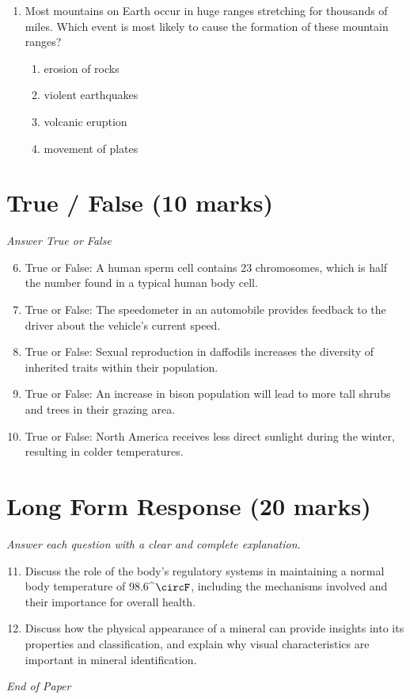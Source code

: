 \documentclass[12pt]{article}
\begin{document}
\begin{enumerate}[label=\arabic*.]
\begin{enumerate}[label=(\alph*)]
    \item a measuring cup
    \item a balance
    \item a magnifying glass
\end{enumerate}
\item Most mountains on Earth occur in huge ranges stretching for thousands of miles. Which event is most likely to cause the formation of these mountain ranges?
\begin{enumerate}[label=(\alph*)]
    \item erosion of rocks
    \item violent earthquakes
    \item volcanic eruption
    \item movement of plates
\end{enumerate}
\end{enumerate}

\section*{True / False (10 marks)}
\textit{Answer True or False}
\begin{enumerate}[label=\arabic*.]
\setcounter{enumi}{5}
\item True or False: A human sperm cell contains 23 chromosomes, which is half the number found in a typical human body cell.
\item True or False: The speedometer in an automobile provides feedback to the driver about the vehicle's current speed.
\item True or False: Sexual reproduction in daffodils increases the diversity of inherited traits within their population.
\item True or False: An increase in bison population will lead to more tall shrubs and trees in their grazing area.
\item True or False: North America receives less direct sunlight during the winter, resulting in colder temperatures.
\end{enumerate}

\section*{Long Form Response (20 marks)}
\textit{Answer each question with a clear and complete explanation.}
\begin{enumerate}[label=\arabic*.]
\setcounter{enumi}{10}
\item Discuss the role of the body's regulatory systems in maintaining a normal body temperature of 98.6^\ensuremath{\circF}, including the mechanisms involved and their importance for overall health.
\item Discuss how the physical appearance of a mineral can provide insights into its properties and classification, and explain why visual characteristics are important in mineral identification.
\end{enumerate}

\vfill
\noindent\textit{End of Paper}
\end{document}
